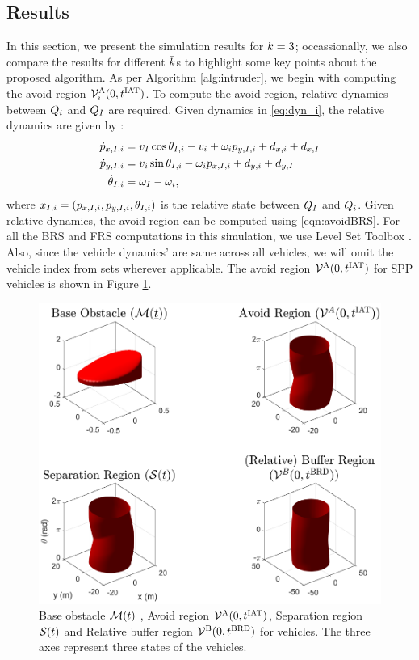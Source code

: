 \subsection{Results \label{sec:simResults}}
In this section, we present the simulation results for $\bar{k} = 3$; occassionally, we also compare the results for different $\bar{k}$s to highlight some key points about the proposed algorithm. As per Algorithm \ref{alg:intruder}, we begin with computing the avoid region $\mathcal{V}^{\text{A}}_{i}(0, t^\text{IAT})$. To compute the avoid region, relative dynamics between $Q_i$ and $Q_{I}$ are required. Given dynamics in \eqref{eq:dyn_i}, the relative dynamics are given by \cite{Mitchell05}:
\begin{equation}
\label{eq:reldyn_i}
\begin{aligned}
\dot{\pos}_{x, \intr, i} &= v_{\intr} \cos \theta_{\intr, i} - v_i + \omega_i {\pos}_{y, \intr, i} + d_{x,i} + d_{x,\intr}\\
\dot{\pos}_{y, \intr, i} &= v_i \sin \theta_{\intr, i} - \omega_i {\pos}_{x, \intr, i} + d_{y,i} + d_{y,\intr}\\
\dot{\theta}_{\intr, i} &= \omega_{\intr} - \omega_i,
\end{aligned}
\end{equation}    
where $x_{I, i} = (p_{x, I, i}, p_{y, I, i}, \theta_{I, i})$ is the relative state between $Q_{I}$ and $Q_i$. Given relative dynamics, the avoid region can be computed using \eqref{eqn:avoidBRS}. For all the BRS and FRS computations in this simulation, we use Level Set Toolbox \cite{Mitchell07b}. Also, since the vehicle dynamics' are same across all vehicles, we will omit the vehicle index from sets wherever applicable. The avoid region $\mathcal{V}^{\text{A}}(0, t^\text{IAT})$ for SPP vehicles is shown in Figure \ref{fig:MaxMin}.
\begin{figure}[H]
  \centering
  \includegraphics[width=\columnwidth]{"figs/bufferRegion_steps"}
  \caption{Base obstacle $\mathcal{M}(t)$ , Avoid region $\mathcal{V}^{\text{A}}(0, t^\text{IAT})$, Separation region $\mathcal{S}(t)$ and Relative buffer region $\mathcal{V}^{\text{B}}(0, t^\text{BRD})$ for vehicles. The three axes represent three states of the vehicles.}
  \label{fig:MaxMin}
\end{figure}
